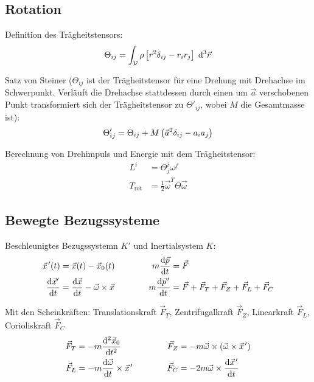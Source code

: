 	\subsection{Rotation}
		\noindent
		Definition des Trägheitstensors:
		\begin{equation}
			\Theta_{ij}=\int_{\mathcal{V}} \rho \left[r^2\delta_{ij}-r_i r_j\right] \;\mathrm{d}^3\vec{r}
		\end{equation}

		\noindent
		Satz von Steiner ($\Theta_{ij}$ ist der Trägheitstensor für eine Drehung mit Drehachse im Schwerpunkt. Verläuft die Drehachse stattdessen durch einen um $\vec{a}$ verschobenen Punkt transformiert sich der Trägheitstensor zu $\Theta'_{ij}$, wobei $M$ die Gesamtmasse ist):
		\begin{equation}
			\Theta'_{ij} = \Theta_{ij} + M\left( \vec{a}^2\delta_{ij} - a_i a_j \right)
		\end{equation}

		\noindent
		Berechnung von Drehimpuls und Energie mit dem	Trägheitstensor:
		\begin{equation}
			\begin{aligned}
				L^i &= \Theta^i_j \omega^j \\
				T_{\mathrm{rot}} &= \frac{1}{2}\vec{\omega}^T \Theta \vec{\omega}
			\end{aligned}
		\end{equation}

	\subsection{Bewegte Bezugssysteme}
		\noindent
		Beschleunigtes Bezugssystemn $K'$ und Inertialsystem $K$:
		\begin{equation}
			\begin{aligned}
				\pvec{x}'(t) &= \vec{x}(t)-\vec{x}_0(t) &\hspace{30pt}
				m\tder{\vec{p}}{t} &= \vec{F} \\
				\tder{\vec{x}'}{t} &= \tder{\vec{x}}{t}-\vec{\omega}\times\vec{x} &\hspace{30pt}
				m\tder{\pvec{p}'}{t} &= \vec{F} + \vec{F}_T + \vec{F}_Z + \vec{F}_L + \vec{F}_C \\
			\end{aligned}
		\end{equation}

		\noindent
		Mit den Scheinkräften: Translationskraft $\vec{F}_T$, Zentrifugalkraft $\vec{F}_Z$, Linearkraft $\vec{F}_L$, Corioliskraft $\vec{F}_C$
		\begin{equation}
			\begin{aligned}
				\vec{F}_T &= -m\frac{\diff^2 \vec{x}_0}{\diff t^2} &\hspace{30pt}
				\vec{F}_Z &= -m\vec{\omega}\times\Br{\vec{\omega}\times\pvec{x}'} \\
				\vec{F}_L &= -m\tder{\vec{\omega}}{t}\times\pvec{x}' &\hspace{30pt}
				\vec{F}_C &= -2m\vec{\omega}\times\tder{\pvec{x}'}{t} \\
			\end{aligned}
		\end{equation}


